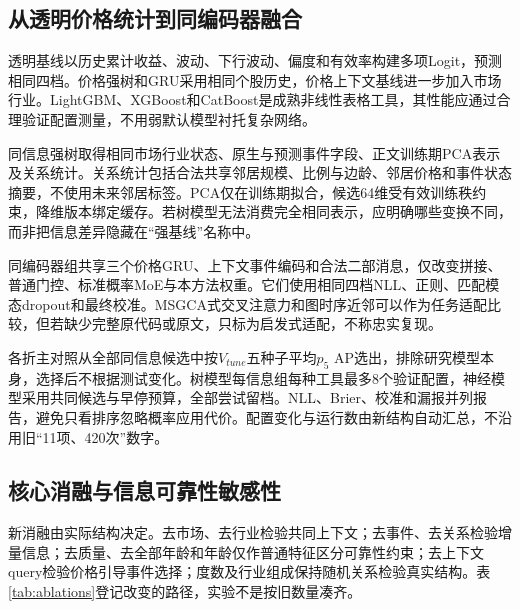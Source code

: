 \subsection{从透明价格统计到同编码器融合}
透明基线以历史累计收益、波动、下行波动、偏度和有效率构建多项Logit，预测相同四档。价格强树和GRU采用相同个股历史，价格上下文基线进一步加入市场行业。LightGBM、XGBoost和CatBoost是成熟非线性表格工具\cite{r25,r26,r27}，其性能应通过合理验证配置测量，不用弱默认模型衬托复杂网络。

同信息强树取得相同市场行业状态、原生与预测事件字段、正文训练期PCA表示及关系统计。关系统计包括合法共享邻居规模、比例与边龄、邻居价格和事件状态摘要，不使用未来邻居标签。PCA仅在训练期拟合，候选64维受有效训练秩约束，降维版本绑定缓存。若树模型无法消费完全相同表示，应明确哪些变换不同，而非把信息差异隐藏在“强基线”名称中。

同编码器组共享三个价格GRU、上下文事件编码和合法二部消息，仅改变拼接、普通门控、标准概率MoE与本方法权重。它们使用相同四档NLL、正则、匹配模态dropout和最终校准。MSGCA式交叉注意力和图时序近邻可以作为任务适配比较，但若缺少完整原代码或原文，只标为启发式适配，不称忠实复现。


各折主对照从全部同信息候选中按$V_{tune}$五种子平均$p_5$ AP选出，排除研究模型本身，选择后不根据测试变化。树模型每信息组每种工具最多8个验证配置，神经模型采用共同候选与早停预算，全部尝试留档。NLL、Brier、校准和漏报并列报告，避免只看排序忽略概率应用代价。配置变化与运行数由新结构自动汇总，不沿用旧“11项、420次”数字。

\subsection{核心消融与信息可靠性敏感性}
新消融由实际结构决定。去市场、去行业检验共同上下文；去事件、去关系检验增量信息；去质量、去全部年龄和年龄仅作普通特征区分可靠性约束；去上下文query检验价格引导事件选择；度数及行业组成保持随机关系检验真实结构。表\ref{tab:ablations}登记改变的路径，实验不是按旧数量凑齐。

